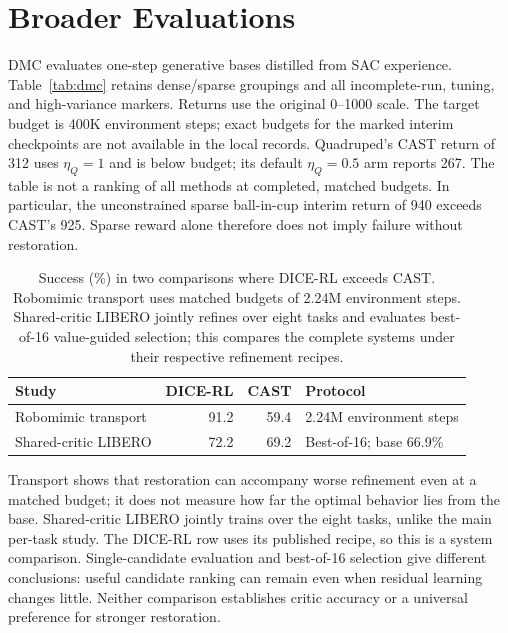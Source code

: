 \section{Broader Evaluations}
\label{supp:scope}

DMC evaluates one-step generative bases distilled from SAC experience.
Table~\ref{tab:dmc} retains dense/sparse groupings and all incomplete-run,
tuning, and high-variance markers. Returns use the original 0--1000 scale.
The target budget is 400K environment steps; exact budgets for the marked
interim checkpoints are not available in the local records. Quadruped's
CAST return of 312 uses $\eta_Q=1$ and is below budget; its default
$\eta_Q=0.5$ arm reports 267. The table is not a ranking of all methods
at completed, matched budgets. In particular, the unconstrained sparse
ball-in-cup interim return of 940 exceeds CAST's 925. Sparse reward alone
therefore does not imply failure without restoration.

\begin{table}[H]
\centering
\caption{Success (\%) in two comparisons where DICE-RL exceeds CAST.
Robomimic transport uses matched budgets of 2.24M environment steps.
Shared-critic LIBERO jointly refines over eight tasks and evaluates
best-of-16 value-guided selection; this compares the complete systems
under their respective refinement recipes.}
\label{supp:scope-reversals}
\small
\begin{tabular}{@{}lrrl@{}}
\toprule
Study & DICE-RL & CAST & Protocol \\
\midrule
Robomimic transport & 91.2 & 59.4 & 2.24M environment steps \\
Shared-critic LIBERO & 72.2 & 69.2 & Best-of-16; base 66.9\% \\
\bottomrule
\end{tabular}
\end{table}

Transport shows that restoration can accompany worse refinement even at
a matched budget; it does not measure how far the optimal behavior lies
from the base. Shared-critic LIBERO jointly trains over the eight tasks,
unlike the main per-task study. The DICE-RL row uses its published recipe,
so this is a system comparison. Single-candidate evaluation and
best-of-16 selection give different conclusions: useful candidate ranking
can remain even when residual learning changes little. Neither comparison
establishes critic accuracy or a universal preference for stronger
restoration.
